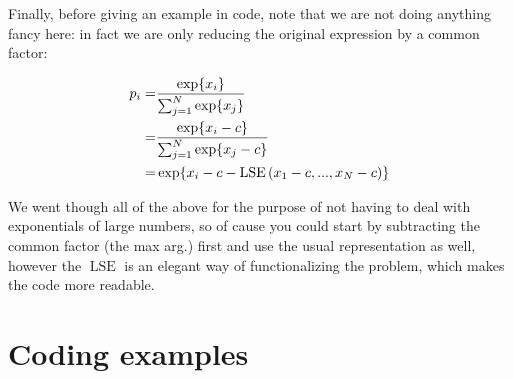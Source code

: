 \documentclass{article}
\DeclareMathOperator{\LSE}{LSE}
\begin{document}
Finally, before giving an example in code, note that we are not doing anything fancy here: in fact we are only reducing the original expression by a common factor:

\begin{align*}
	p_{i} =& \frac{\exp{x_{i}}}{\sum_{j=1}^{N} \exp{x_{j}}} \\
	=& \frac{\exp{x_{i} - c}}{\sum_{j=1}^{N} \exp{x_{j} - c}} \\
	=& \exp{ x_{i} - c - \LSE \qty(x_{1}-c, ..., x_{N}-c) }
\end{align*}

We went though all of the above for the purpose of not having to deal with exponentials of large numbers, so of cause you could start by subtracting the common factor (the max arg.) first and use the usual representation as well, however the $\LSE$ is an elegant way of functionalizing the problem, which makes the code more readable. 

\section{Coding examples}




\appendix

\newpage
% 
% 

% 

% 
\end{document}
